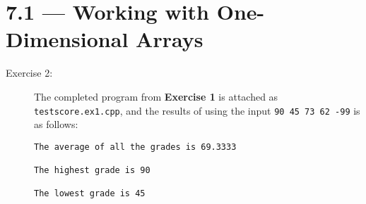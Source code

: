 \documentclass[11pt]{article}
\begin{document}
\section*{7.1 --- Working with One-Dimensional Arrays}
\begin{description}
    \item[Exercise 2:] The completed program from \textbf{Exercise 1} is attached as \texttt{testscore.ex1.cpp}, and the results of using the input \texttt{90 45 73 62 -99} is as follows: \begin{verbatim}
The average of all the grades is 69.3333

The highest grade is 90

The lowest grade is 45
    \end{verbatim}
\end{description}
\end{document}
